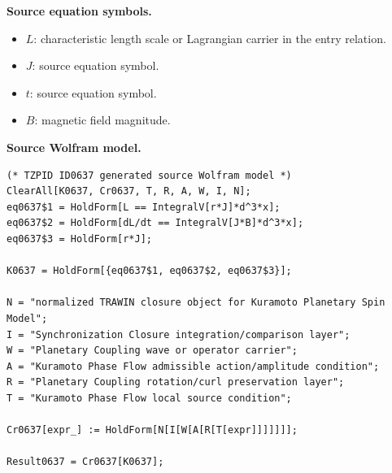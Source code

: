 \begin{minipage}[t]{0.49\linewidth}
\begingroup
\small
\raggedright
\textbf{Source equation symbols.}\par
\begin{itemize}[leftmargin=1.35em,itemsep=1pt,topsep=1pt,parsep=0pt]
    \item $L$: characteristic length scale or Lagrangian carrier in the entry relation.
    \item $J$: source equation symbol.
    \item $t$: source equation symbol.
    \item $B$: magnetic field magnitude.
\end{itemize}
\endgroup
\end{minipage}\hfill
\begin{minipage}[t]{0.47\linewidth}
\begingroup
\scriptsize
\raggedright
\textbf{Source Wolfram model.}\par
\begin{Verbatim}[fontsize=\tiny,breaklines=true,breakanywhere=true]
(* TZPID ID0637 generated source Wolfram model *)
ClearAll[K0637, Cr0637, T, R, A, W, I, N];
eq0637$1 = HoldForm[L == IntegralV[r*J]*d^3*x];
eq0637$2 = HoldForm[dL/dt == IntegralV[J*B]*d^3*x];
eq0637$3 = HoldForm[r*J];

K0637 = HoldForm[{eq0637$1, eq0637$2, eq0637$3}];

N = "normalized TRAWIN closure object for Kuramoto Planetary Spin Model";
I = "Synchronization Closure integration/comparison layer";
W = "Planetary Coupling wave or operator carrier";
A = "Kuramoto Phase Flow admissible action/amplitude condition";
R = "Planetary Coupling rotation/curl preservation layer";
T = "Kuramoto Phase Flow local source condition";

Cr0637[expr_] := HoldForm[N[I[W[A[R[T[expr]]]]]]];

Result0637 = Cr0637[K0637];
\end{Verbatim}
\endgroup
\end{minipage}


